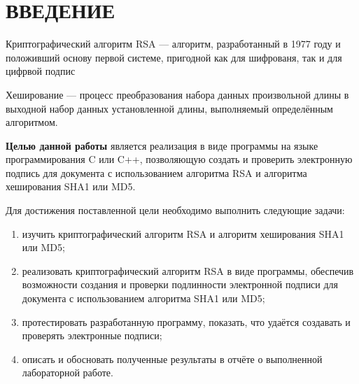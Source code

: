 \chapter*{ВВЕДЕНИЕ}

Криптографический алгоритм RSA --- алгоритм, разработанный в 1977 году и положивший основу первой системе, пригодной как для шифрованя, так и для цифрвой подпис

Хеширование --- процесс преобразования набора данных произвольной длины в выходной набор данных установленной длины, выполняемый определённым алгоритмом.

\textbf{Целью данной работы} является реализация в виде программы на языке программирования C или C++, позволяющую создать и проверить электронную подпись для документа с использованием алгоритма RSA и алгоритма хеширования SHA1 или MD5.

Для достижения поставленной цели необходимо выполнить следующие задачи:
\begin{enumerate}[label=\arabic*)]
	\item изучить криптографический алгоритм RSA и алгоритм хеширования SHA1 или MD5;
	\item реализовать криптографический алгоритм RSA в виде программы, обеспечив возможности создания и проверки подлинности электронной подписи для документа с использованием алгоритма SHA1 или MD5;
	\item протестировать разработанную программу, показать, что удаётся создавать и проверять электронные подписи;
	\item описать и обосновать полученные результаты в отчёте о выполненной лабораторной работе.
\end{enumerate}
